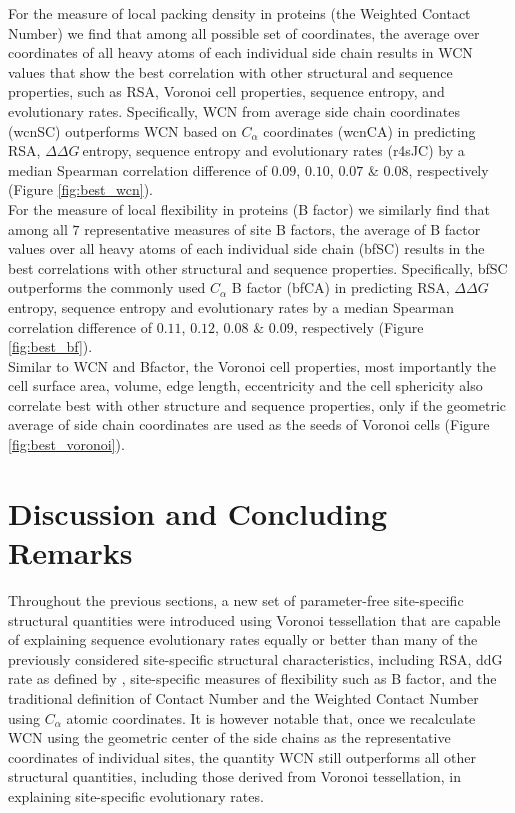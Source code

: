 \documentclass[11pt]{article}
\newcommand{\ddg}{$\Delta\Delta G~$}
\begin{document}
        For the measure of local packing density in proteins (the Weighted Contact Number) we find that among all possible set of coordinates, the average over coordinates of all heavy atoms of each individual side chain results in WCN values that show the best correlation with other structural and sequence properties, such as RSA, Voronoi cell properties, sequence entropy, and evolutionary rates. Specifically, WCN from average side chain coordinates (wcnSC) outperforms WCN based on $C_\alpha$ coordinates (wcnCA) in predicting RSA, \ddg entropy, sequence entropy and evolutionary rates (r4sJC) by a median Spearman correlation difference of $0.09$, $0.10$, $0.07$ \& $0.08$, respectively (Figure \ref{fig:best_wcn}).
        \\

        For the measure of local flexibility in proteins (B factor) we similarly find that among all $7$ representative measures of site B factors, the average of B factor values over all heavy atoms of each individual side chain (bfSC) results in the best correlations with other structural and sequence properties. Specifically, bfSC outperforms the commonly used $C_\alpha$ B factor (bfCA) in predicting RSA, \ddg entropy, sequence entropy and evolutionary rates by a median Spearman correlation difference of $0.11$, $0.12$, $0.08$ \& $0.09$, respectively (Figure \ref{fig:best_bf}).
        \\

        Similar to WCN and Bfactor, the Voronoi cell properties, most importantly the cell surface area, volume, edge length, eccentricity and the cell sphericity also correlate best with other structure and sequence properties, only if the geometric average of side chain coordinates are used as the seeds of Voronoi cells (Figure \ref{fig:best_voronoi}).
        \\

\section{Discussion and Concluding Remarks}
\label{sec:dcr}

		Throughout the previous sections, a new set of parameter-free site-specific structural quantities were introduced using Voronoi tessellation that are capable of explaining sequence evolutionary rates equally or better than many of the previously considered site-specific structural characteristics, including RSA, ddG rate as defined by \citet{echave_relationship_2014}, site-specific measures of flexibility such as B factor, and the traditional definition of Contact Number and the Weighted Contact Number using $C_\alpha$ atomic coordinates. It is however notable that, once we recalculate WCN using the geometric center of the side chains as the representative coordinates of individual sites, the quantity WCN still outperforms all other structural quantities, including those derived from Voronoi tessellation, in explaining site-specific evolutionary rates.
		
\end{document}
